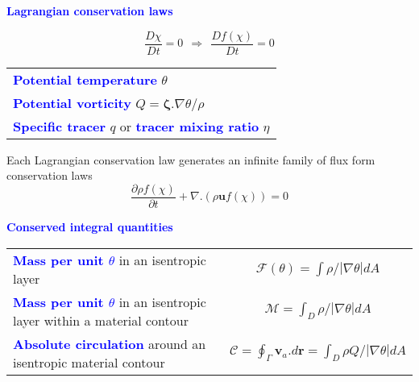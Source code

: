 \documentclass[a4]{seminar}
\newcommand{\B}[1]{\textcolor{blue}{#1}}
\begin{document}
\begin{slide}

\B{\bf Lagrangian conservation laws}

\begin{displaymath}
\frac{D \chi}{D t} = 0 \ \ \Rightarrow \ \ \frac{D f(\chi)}{D t} = 0
\end{displaymath}

\vspace{2mm}

\begin{tabular}{|l|}
\hline
\B{\bf Potential temperature} \( \theta \) \\
\B{\bf Potential vorticity} \( Q = \boldsymbol{\zeta} . \nabla \theta / \rho \) \\
\B{\bf Specific tracer} \( q \) or \B{\bf tracer mixing ratio} \( \eta \) \\
\hline
\end{tabular}

\vspace{2mm}

Each Lagrangian conservation law generates an infinite family of
flux form conservation laws
\begin{displaymath}
\frac{\partial \rho f(\chi)}{\partial t}+
\nabla .\left( \rho \mathbf{u} f(\chi) \right) = 0
\end{displaymath}


\end{slide}


\begin{slide}

\B{\bf Conserved integral quantities}

\begin{tabular}{|p{45mm}c|}
\hline
\B{\bf Mass per unit \( \theta \)} in an isentropic layer
&
\( \mathcal{F}(\theta )=\int \rho /\left| \nabla \theta \right| dA \)
\\
\B{\bf Mass per unit \( \theta \)} in an isentropic layer within a material contour
&
\( \mathcal{M}=\int_{D}\rho /\left| \nabla \theta \right| dA \)
\\
\B{\bf Absolute circulation} around an isentropic material contour
&
\( \mathcal{C}=\oint_{\Gamma }\mathbf{v}_{a}.d\mathbf{r}
=\int_{D}\rho Q/\left| \nabla \theta \right| dA \)
\\
\hline
\end{tabular}


\end{slide}
\end{document}
